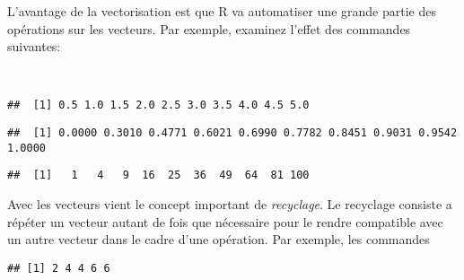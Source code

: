 L'avantage de la vectorisation est que R va automatiser une grande partie des opérations sur les vecteurs.
Par exemple, examinez l'effet des commandes suivantes:

\begin{knitrout}
\color{fgcolor}\begin{kframe}
\begin{flushleft}
\ttfamily\noindent
{}\hlassignement{\usebox{\hlnormalsizeboxlessthan}-}{\ }\hlkeyword{(}\hlkeyword{:}\hlkeyword{)}\hspace*{\fill}\\
\hlstd{}\hlkeyword{/}\mbox{}
\normalfont
\end{flushleft}
\begin{verbatim}
##  [1] 0.5 1.0 1.5 2.0 2.5 3.0 3.5 4.0 4.5 5.0
\end{verbatim}
\begin{flushleft}
\ttfamily\noindent
{}\hlkeyword{(}\hlkeyword{,}{\ }\hlkeyword{)}\mbox{}
\normalfont
\end{flushleft}
\begin{verbatim}
##  [1] 0.0000 0.3010 0.4771 0.6021 0.6990 0.7782 0.8451 0.9031 0.9542 1.0000
\end{verbatim}
\begin{flushleft}
\ttfamily\noindent
{}\hlkeyword{*}{\ }\mbox{}
\normalfont
\end{flushleft}
\begin{verbatim}
##  [1]   1   4   9  16  25  36  49  64  81 100
\end{verbatim}
\end{kframe}
\end{knitrout}


Avec les vecteurs vient le concept important de \emph{recyclage}.
Le recyclage consiste a répéter un vecteur autant de fois que nécessaire pour le rendre compatible avec un autre vecteur dans le cadre d'une opération.
Par exemple, les commandes

\begin{knitrout}
\color{fgcolor}\begin{kframe}
\begin{flushleft}
\ttfamily\noindent
{}\hlkeyword{(}\hlkeyword{,}{\ }\hlkeyword{,}{\ }\hlkeyword{,}{\ }\hlkeyword{,}{\ }\hlkeyword{)}{\ }\hlkeyword{+}{\ }\hlkeyword{(}\hlkeyword{,}{\ }\hlkeyword{)}\mbox{}
\normalfont
\end{flushleft}
\begin{verbatim}
## [1] 2 4 4 6 6
\end{verbatim}
\end{kframe}
\end{knitrout}


